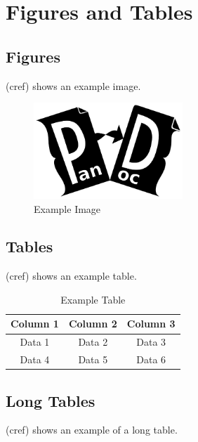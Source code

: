 \documentclass{article}
\begin{document}
\section{Figures and Tables}
\label{sec:figures_tables}
\subsection{Figures}
 (cref) shows an example image.

\begin{figure}[H]
    \centering
    \includegraphics[width=0.5\textwidth]{./example-image}
    \caption{Example Image}
    \label{fig:example}
\end{figure}

\subsection{Tables}
 (cref) shows an example table.

\begin{table}[H]
    \centering
    \begin{tabular}{|c|c|c|}
        \hline
        Column 1 & Column 2 & Column 3 \\
        \hline
        Data 1 & Data 2 & Data 3 \\
        Data 4 & Data 5 & Data 6 \\
        \hline
    \end{tabular}
    \caption{Example Table}
    \label{tab:example}
\end{table}

\subsection{Long Tables}
 (cref) shows an example of a long table.
\end{document}
